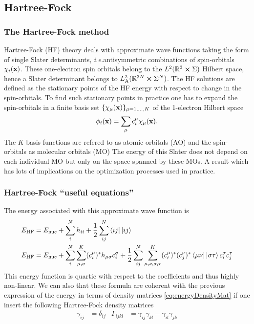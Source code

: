 \documentclass[11pt,a4paper]{article}
\newcommand{\ie}{\textit{i.e.}}
\newcommand{\HF}{\text{HF}}
\begin{document}
\subsection{Hartree-Fock}
\label{sec:HF}

\subsubsection{The Hartree-Fock method}
\label{sec:introHF}

Hartree-Fock (HF) theory deals with approximate wave functions taking the form of single Slater determinants, \ie antisymmetric combinations of spin-orbitals $\chi_i(\vb{x})$.
These one-electron spin orbitals belong to the $L^2(\mathbb{R}^{3}\cross \Sigma)$ Hilbert space, hence a Slater determinant belongs to $L^2_{\text{A}}(\mathbb{R}^{3N}\cross \Sigma^N)$.
The HF solutions are defined as the stationary points of the HF energy with respect to change in the spin-orbitals.
To find such stationary points in practice one has to expand the spin-orbitals in a finite basis set $\{\chi_{\mu}(\vb{x})\}_{\mu=1,\dots,K}$ of the 1-electron Hilbert space
\begin{equation}
  \label{eq:HF_MO}
  \phi_i(\vb{x}) = \sum_\mu c_i^\mu \chi_{\mu}(\vb{x}).
\end{equation}
The $K$ basis functions are refered to as atomic orbitals (AO) and the spin-orbitals as molecular orbitals (MO)
The energy of this Slater does not depend on each individual MO but only on the space spanned by these MOs. A result which has lots of implications on the optimization processes used in practice.

\subsubsection{Hartree-Fock ``useful equations''}
\label{sec:formularyHF}

The energy associated with this approximate wave function is
\begin{align}
  \label{eq:HF_NRJ}
  E_{\HF} &=  E_{\text{nuc}} + \sum_i^{N}h_{ii} + \frac{1}{2}\sum_{ij}^N\bra{ij}\hspace{0.1px}\ket{ij} \\
  E_{\HF} &=  E_{\text{nuc}} + \sum_i^N \sum_{\mu,\sigma}^K (c_i^\mu)^* h_{\mu\sigma} c_i^\sigma + \frac{1}{2} \sum_{ij}^N \sum_{\mu,\nu,\sigma,\tau}^K (c_i^\mu)^*(c_j^\nu)^* \bra{\mu\nu}\hspace{0.1px}\ket{\sigma\tau} c_i^\sigma c_j^\tau 
\end{align}
This energy function is quartic with respect to the coefficients and thus highly non-linear.
We can also that these formula are coherent with the previous expression of the energy in terms of density matrices \eqref{eq:energyDensityMat}
if one insert the following Hartree-Fock density matrices
\begin{align}
  \label{eq:HF_RDM}
  \gamma_{ij}&= \delta_{ij}
  &
  \Gamma_{ijkl}&=\gamma_{ij}\gamma_{kl} - \gamma_{il}\gamma_{jk}
\end{align}
\end{document}

